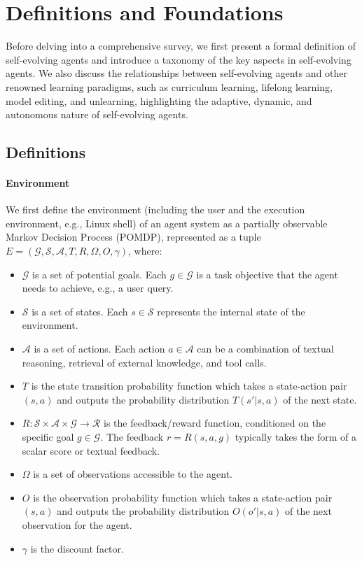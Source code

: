 \section{Definitions and Foundations}

Before delving into a comprehensive survey, we first present a formal definition of self-evolving agents and introduce a taxonomy of the key aspects in self-evolving agents. We also discuss the relationships between self-evolving agents and other renowned learning paradigms, such as curriculum learning, lifelong learning, model editing, and unlearning, highlighting the adaptive, dynamic, and autonomous nature of self-evolving agents.

\subsection{Definitions}
\label{sec:definition}

\paragraph{Environment} We first define the environment (including the user and the execution environment, e.g., Linux shell) of an agent system as a partially observable Markov Decision Process (POMDP), represented as a tuple $E=(\mathcal{G}, \mathcal{S}, \mathcal{A}, T, R, \Omega, O, \gamma)$, where:
\begin{itemize}
\item $\mathcal{G}$ is a set of potential goals. Each $g\in \mathcal{G}$ is a task objective that the agent needs to achieve, e.g., a user query.
\item $\mathcal{S}$ is a set of states. Each $s\in \mathcal{S}$ represents the internal state of the environment.
\item $\mathcal{A}$ is a set of actions. Each action $a\in \mathcal{A}$ can be a combination of textual reasoning, retrieval of external knowledge, and tool calls.
\item $T$ is the state transition probability function which takes a state-action pair $(s,a)$ and outputs the probability distribution $T(s'|s,a)$ of the next state.
\item $R:\mathcal{S}\times \mathcal{A} \times \mathcal{G} \rightarrow \mathcal{R}$ is the feedback/reward function, conditioned on the specific goal $g\in \mathcal{G}$. The feedback $r=R(s,a,g)$ typically takes the form of a scalar score or textual feedback.
\item $\Omega$ is a set of observations accessible to the agent.
\item $O$ is the observation probability function which takes a state-action pair $(s,a)$ and outputs the probability distribution $O(o'|s,a)$ of the next observation for the agent.
\item $\gamma$ is the discount factor.
\end{itemize}

